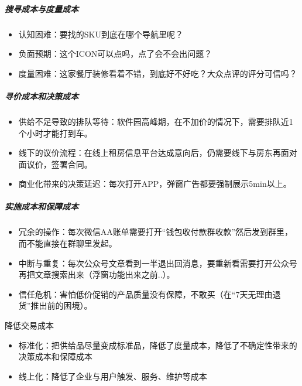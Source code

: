 \documentclass[letterpaper,11pt,english]{sphinxmanual}
\begin{document}
\subparagraph{搜寻成本与度量成本}
\label{\detokenize{chapter_idea/business:id21}}\begin{itemize}
\item {} 
认知困难：要找的SKU到底在哪个导航里呢？

\item {} 
负面预期：这个ICON可以点吗，点了会不会出问题？

\item {} 
度量困难：这家餐厅装修看着不错，到底好不好吃？大众点评的评分可信吗？

\end{itemize}


\subparagraph{寻价成本和决策成本}
\label{\detokenize{chapter_idea/business:id22}}\begin{itemize}
\item {} 
供给不足导致的排队等待：软件园高峰期，在不加价的情况下，需要排队近1个小时才能打到车。

\item {} 
线下的议价流程：在线上租房信息平台达成意向后，仍需要线下与房东再面对面议价，签署合同。

\item {} 
商业化带来的决策延迟：每次打开APP，弹窗广告都要强制展示5min以上。

\end{itemize}


\subparagraph{实施成本和保障成本}
\label{\detokenize{chapter_idea/business:id23}}\begin{itemize}
\item {} 
冗余的操作：每次微信AA账单需要打开“钱包\sphinxhyphen{}收付款\sphinxhyphen{}群收款”然后发到群里，而不能直接在群聊里发起。

\item {} 
中断与重复：每次公众号文章看到一半退出回消息，要重新看需要打开公众号再把文章搜索出来（浮窗功能出来之前..）。

\item {} 
信任危机：害怕低价促销的产品质量没有保障，不敢买（在“7天无理由退货”推出前的困境）。

\end{itemize}

降低交易成本
\begin{itemize}
\item {} 
标准化：把供给品尽量变成标准品，降低了度量成本，降低了不确定性带来的决策成本和保障成本

\item {} 
线上化：降低了企业与用户触发、服务、维护等成本

\end{itemize}
\end{document}
